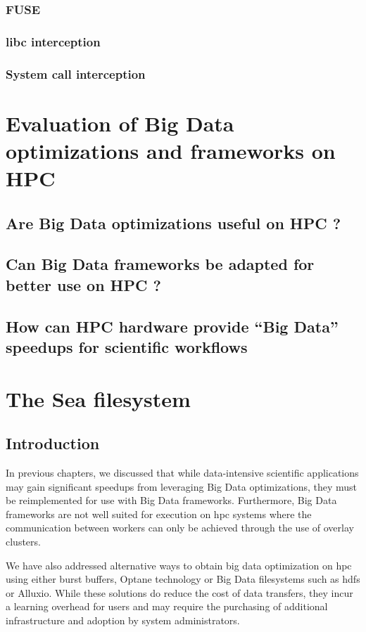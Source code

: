 \documentclass{report}
\begin{document}
            \subsection{FUSE}
            \subsection{libc interception}
            \subsection{System call interception}

    \chapter{Evaluation of Big Data optimizations and frameworks on HPC}\label{chp:eval}
        \section{Are Big Data optimizations useful on HPC ?}
        \section{Can Big Data frameworks be adapted for better use on HPC ?}
        \section{How can HPC hardware provide ``Big Data'' speedups for scientific workflows}
    \chapter{The Sea filesystem}
    \section{Introduction}
    In previous chapters, we discussed that while data-intensive scientific 
    applications may gain significant speedups from leveraging Big Data optimizations,
    they must be reimplemented for use with Big Data frameworks. Furthermore, Big Data
    frameworks are not well suited for execution on \gls{hpc} systems where the 
    communication between workers can only be achieved through the use of overlay
    clusters.

    We have also addressed alternative ways to obtain big data optimization on \gls{hpc}
    using either burst buffers, Optane technology or Big Data filesystems such as \gls{hdfs}
    or Alluxio. While these solutions do reduce the cost of data transfers, they incur
    a learning overhead for users and may require the purchasing of additional infrastructure and
    adoption by system administrators.
\end{document}
